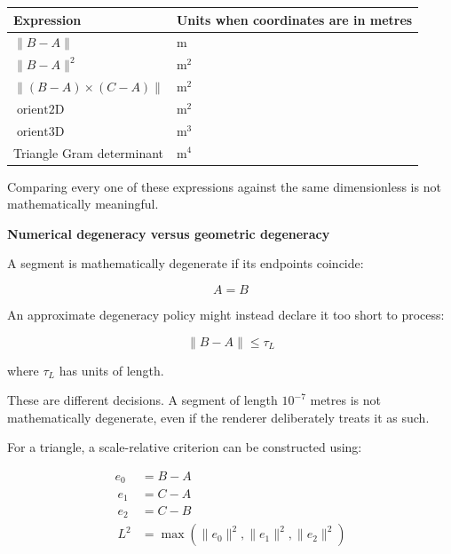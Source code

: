 {\def\LTcaptype{none} %
\begin{longtable}[]{@{}
  >{\raggedright\arraybackslash}p{}
  >{\raggedright\arraybackslash}p{}@{}}
\toprule\noalign{}
\begin{minipage}[b]{\linewidth}\raggedright
Expression
\end{minipage} & \begin{minipage}[b]{\linewidth}\raggedright
Units when coordinates are in metres
\end{minipage} \\
\midrule\noalign{}
\endhead
\bottomrule\noalign{}
\endlastfoot
\(\|B-A\|\) & \(\mathrm m\) \\
\(\|B-A\|^2\) & \(\mathrm m^2\) \\
\(\|(B-A)\times(C-A)\|\) & \(\mathrm m^2\) \\
\(\operatorname{orient2D}\) & \(\mathrm m^2\) \\
\(\operatorname{orient3D}\) & \(\mathrm m^3\) \\
Triangle Gram determinant & \(\mathrm m^4\) \\
\end{longtable}
}

Comparing every one of these expressions against the same dimensionless  is not mathematically meaningful.

\textbf{Numerical degeneracy versus geometric degeneracy}

A segment is mathematically degenerate if its endpoints coincide:

\[
A=B
\]

An approximate degeneracy policy might instead declare it too short to process:

\[
\|B-A\|\le \tau_L
\]

where \(\tau_L\) has units of length.

These are different decisions. A segment of length \(10^{-7}\) metres is not mathematically degenerate, even if the renderer deliberately treats it as such.

For a triangle, a scale-relative criterion can be constructed using:

\[
\begin{aligned} e_0&=B-A\\\ e_1&=C-A\\\ e_2&=C-B\\\ L^2&=\max(\|e_0\|^2,\|e_1\|^2,\|e_2\|^2) \end{aligned}
\]

